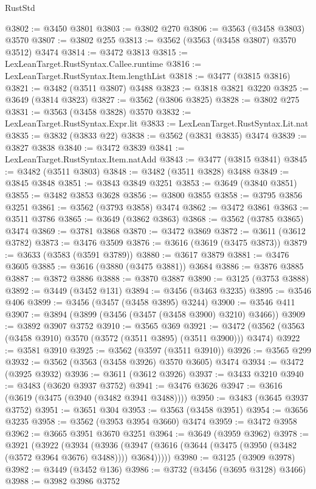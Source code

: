 \begin{lexlean}{RustStd}
\begin{coremodule}
{\begin{coremodule}
{{{{{{{{{{{{{{{{{{{{{{{{{{{{{{{{{{{{{{{{{{{{{@3802 := @3450 @3801
@3803 := @3802 @270
@3806 := @3563 (@3458 @3803) @3570
@3807 := @3802 @255
@3813 := @3562 (@3563 (@3458 @3807) @3570 @3512) @3474
@3814 := @3472 @3813
@3815 := LexLeanTarget.RustSyntax.Callee.runtime
@3816 := LexLeanTarget.RustSyntax.Item.lengthList
@3818 := @3477 (@3815 @3816)
@3821 := @3482 (@3511 @3807) @3488
@3823 := @3818 @3821 @3220
@3825 := @3649 (@3814 @3823)
@3827 := @3562 (@3806 @3825)
@3828 := @3802 @275
@3831 := @3563 (@3458 @3828) @3570
@3832 := LexLeanTarget.RustSyntax.Expr.lit
@3833 := LexLeanTarget.RustSyntax.Lit.nat
@3835 := @3832 (@3833 @22)
@3838 := @3562 (@3831 @3835) @3474
@3839 := @3827 @3838
@3840 := @3472 @3839
@3841 := LexLeanTarget.RustSyntax.Item.natAdd
@3843 := @3477 (@3815 @3841)
@3845 := @3482 (@3511 @3803)
@3848 := @3482 (@3511 @3828) @3488
@3849 := @3845 @3848
@3851 := @3843 @3849 @3251
@3853 := @3649 (@3840 @3851)
@3855 := @3482 @3853 @3628
@3856 := @3800 @3855
@3858 := @3795 @3856 @3251
@3861 := @3562 (@3793 @3858) @3474
@3862 := @3472 @3861
@3863 := @3511 @3786
@3865 := @3649 (@3862 @3863)
@3868 := @3562 (@3785 @3865) @3474
@3869 := @3781 @3868
@3870 := @3472 @3869
@3872 := @3611 (@3612 @3782)
@3873 := @3476 @3509
@3876 := @3616 (@3619 (@3475 @3873))
@3879 := @3633 (@3583 (@3591 @3789))
@3880 := @3617 @3879
@3881 := @3476 @3605
@3885 := @3616 (@3880 (@3475 @3881)) @3684
@3886 := @3876 @3885
@3887 := @3872 @3886
@3888 := @3870 @3887
@3890 := @3125 (@3753 @3888)
@3892 := @3449 (@3452 @131)
@3894 := @3456 (@3463 @3235)
@3895 := @3546 @406
@3899 := @3456 (@3457 (@3458 @3895) @3244)
@3900 := @3546 @411
@3907 := @3894 (@3899 (@3456 (@3457 (@3458 @3900) @3210) @3466))
@3909 := @3892 @3907 @3752
@3910 := @3565 @369
@3921 := @3472 (@3562 (@3563 (@3458 @3910) @3570 (@3572 (@3511 @3895) (@3511 @3900))) @3474)
@3922 := @3581 @3910
@3925 := @3562 (@3597 (@3511 @3910))
@3926 := @3565 @299
@3932 := @3562 (@3563 (@3458 @3926) @3570 @3605) @3474
@3934 := @3472 (@3925 @3932)
@3936 := @3611 (@3612 @3926)
@3937 := @3433 @3210
@3940 := @3483 (@3620 @3937 @3752)
@3941 := @3476 @3626
@3947 := @3616 (@3619 (@3475 (@3940 (@3482 @3941 @3488))))
@3950 := @3483 (@3645 @3937 @3752)
@3951 := @3651 @304
@3953 := @3563 (@3458 @3951)
@3954 := @3656 @3235
@3958 := @3562 (@3953 @3954 @3660) @3474
@3959 := @3472 @3958
@3962 := @3665 @3951 @3670 @3251
@3964 := @3649 (@3959 @3962)
@3978 := @3921
    (@3922
      (@3934
        (@3936 (@3947 (@3616 (@3644 (@3475 (@3950 (@3482 (@3572 @3964 @3676) @3488)))) @3684)))))
@3980 := @3125 (@3909 @3978)
@3982 := @3449 (@3452 @136)
@3986 := @3732 (@3456 (@3695 @3128) @3466)
@3988 := @3982 @3986 @3752
}}}}}}}}}}}}}}}}}}}}}}}}}}}}}}}}}}}}}}}}}}}}}
\end{coremodule}}
\end{coremodule}
\end{lexlean}
